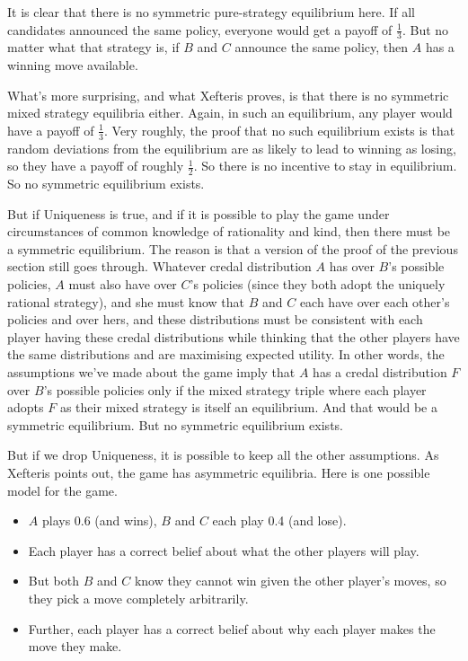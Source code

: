 \documentclass[12pt,]{article}
\providecommand{\tightlist}{%
  \setlength{\itemsep}{0pt}\setlength{\parskip}{0pt}}
\begin{document}
It is clear that there is no symmetric pure-strategy equilibrium here. If all candidates announced the same policy, everyone would get a payoff of \(\frac{1}{3}\). But no matter what that strategy is, if \(B\) and \(C\) announce the same policy, then \(A\) has a winning move available.

What's more surprising, and what Xefteris proves, is that there is no symmetric mixed strategy equilibria either. Again, in such an equilibrium, any player would have a payoff of \(\frac{1}{3}\). Very roughly, the proof that no such equilibrium exists is that random deviations from the equilibrium are as likely to lead to winning as losing, so they have a payoff of roughly \(\frac{1}{2}\). So there is no incentive to stay in equilibrium. So no symmetric equilibrium exists.

But if Uniqueness is true, and if it is possible to play the game under circumstances of common knowledge of rationality and kind, then there must be a symmetric equilibrium. The reason is that a version of the proof of the previous section still goes through. Whatever credal distribution \(A\) has over \(B\)'s possible policies, \(A\) must also have over \(C\)'s policies (since they both adopt the uniquely rational strategy), and she must know that \(B\) and \(C\) each have over each other's policies and over hers, and these distributions must be consistent with each player having these credal distributions while thinking that the other players have the same distributions and are maximising expected utility. In other words, the assumptions we've made about the game imply that \(A\) has a credal distribution \(F\) over \(B\)'s possible policies only if the mixed strategy triple where each player adopts \(F\) as their mixed strategy is itself an equilibrium. And that would be a symmetric equilibrium. But no symmetric equilibrium exists.

But if we drop Uniqueness, it is possible to keep all the other assumptions. As Xefteris points out, the game has asymmetric equilibria. Here is one possible model for the game.

\begin{itemize}
\tightlist
\item
  \(A\) plays 0.6 (and wins), \(B\) and \(C\) each play 0.4 (and lose).
\item
  Each player has a correct belief about what the other players will play.
\item
  But both \(B\) and \(C\) know they cannot win given the other player's moves, so they pick a move completely arbitrarily.
\item
  Further, each player has a correct belief about why each player makes the move they make.
\end{itemize}
\end{document}
